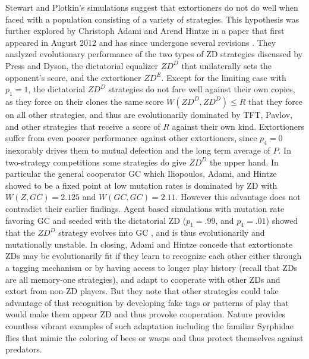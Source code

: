 Stewart and Plotkin's simulations suggest that extortioners do not do well when faced with a population consisting of a variety of strategies. This hypothesis was further explored by Christoph Adami and Arend Hintze in a paper that first appeared in August 2012 and has since undergone several revisions \cite{Adami_Hintze_2014}. They analyzed evolutionary performance of the two types of ZD strategies discussed by Press and Dyson, the dictatorial equalizer $ZD^D$ that unilaterally sets the opponent's score, and the extortioner $ZD^E$. Except for the limiting case with $p_1 = 1$, the dictatorial $ZD^D$ strategies do not fare well against their own copies, as they force on their clones the same score $W(ZD^D, ZD^D) \leq R$ that they force on all other strategies, and thus are evolutionarily dominated by TFT, Pavlov, and other strategies that receive a score of $R$ against their own kind. Extortioners suffer from even poorer performance against other extortioners, since $p_4 = 0$ inexorably drives them to mutual defection and the long term average of $P$. In two-strategy competitions some strategies do give $ZD^D$ the upper hand. In particular the general cooperator GC which Iliopoulos, Adami, and Hintze showed to be a fixed point at low mutation rates \cite{iliopoulos_2010} is dominated by ZD with $W(Z, GC) = 2.125$ and $W(GC, GC) = 2.11$. However this advantage does not contradict their earlier findings. Agent based simulations with mutation rate favoring GC and seeded with the dictatorial ZD ($p_1 = .99$, and $p_4 = .01$) showed that the $ZD^D$ strategy evolves into GC \cite{Adami_Hintze_2014}, and is thus evolutionarily and mutationally unstable. In closing, Adami and Hintze concede that extortionate ZDs may be evolutionarily fit if they learn to recognize each other either through a tagging mechanism or by having access to longer play history (recall that ZDs are all memory-one strategies), and adapt to cooperate with other ZDs and extort from non-ZD players. But they note that other strategies could take advantage of that recognition by developing fake tags or patterns of play that would make them appear ZD and thus provoke cooperation. Nature provides countless vibrant examples of such adaptation including the familiar Syrphidae flies that mimic the coloring of bees or wasps and thus protect themselves against predators.

